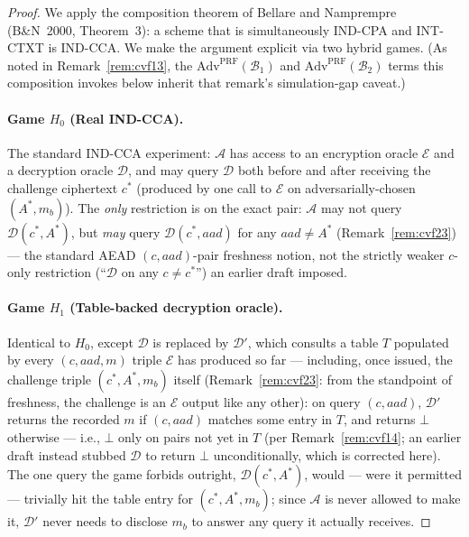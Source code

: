 \documentclass[11pt,a4paper]{article}
\begin{document}
\begin{proof}
We apply the composition theorem of Bellare and
Namprempre~\cite{bellare2000ae} (B\&N~2000, Theorem~3): a scheme that
is simultaneously IND-CPA and INT-CTXT is IND-CCA.  We make the argument
explicit via two hybrid games. (As noted in Remark~\ref{rem:cvf13}, the
$\mathrm{Adv}^{\mathrm{PRF}}(\mathcal{B}_1)$ and
$\mathrm{Adv}^{\mathrm{PRF}}(\mathcal{B}_2)$ terms this composition
invokes below inherit that remark's simulation-gap caveat.)

\paragraph{Game $H_0$ (Real IND-CCA).}
The standard IND-CCA experiment: $\mathcal{A}$ has access to an encryption
oracle $\mathcal{E}$ and a decryption oracle $\mathcal{D}$, and may query
$\mathcal{D}$ both before and after receiving the challenge ciphertext
$c^*$ (produced by one call to $\mathcal{E}$ on adversarially-chosen
$(A^*,m_b)$). The \emph{only} restriction is on the exact pair:
$\mathcal{A}$ may not query $\mathcal{D}(c^*, A^*)$, but \emph{may} query
$\mathcal{D}(c^*, aad)$ for any $aad \neq A^*$ (Remark~\ref{rem:cvf23}) ---
the standard AEAD $(c,aad)$-pair freshness notion, not the strictly
weaker $c$-only restriction (``$\mathcal{D}$ on any $c \neq c^*$'') an
earlier draft imposed.

\paragraph{Game $H_1$ (Table-backed decryption oracle).}
Identical to $H_0$, except $\mathcal{D}$ is replaced by $\mathcal{D}'$,
which consults a table $T$ populated by every $(c, aad, m)$ triple
$\mathcal{E}$ has produced so far --- including, once issued, the
challenge triple $(c^*, A^*, m_b)$ itself (Remark~\ref{rem:cvf23}: from
the standpoint of freshness, the challenge is an $\mathcal{E}$ output like
any other): on query $(c, aad)$, $\mathcal{D}'$ returns the recorded $m$
if $(c, aad)$ matches some entry in $T$, and returns $\bot$ otherwise ---
i.e., $\bot$ only on pairs not yet in $T$ (per Remark~\ref{rem:cvf14}; an
earlier draft instead stubbed $\mathcal{D}$ to return $\bot$
unconditionally, which is corrected here). The one query the game
forbids outright, $\mathcal{D}(c^*,A^*)$, would --- were it permitted ---
trivially hit the table entry for $(c^*,A^*,m_b)$; since $\mathcal{A}$ is
never allowed to make it, $\mathcal{D}'$ never needs to disclose $m_b$ to
answer any query it actually receives.


\end{proof}
\end{document}
